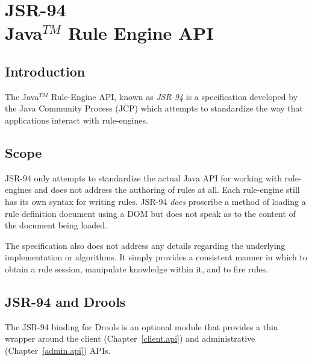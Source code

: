 \chapter[JSR-94 : Java$^{TM}$ Rule-Engine API]{JSR-94\\Java$^{TM}$ Rule Engine API}

\section{Introduction}

The Java$^{TM}$ Rule-Engine API, known as \emph{JSR-94} is a
specification developed by the Java Community Process (JCP)
which attempts to standardize the way that applications interact
with rule-engines.

\section{Scope}

JSR-94 only attempts to standardize the actual Java API for working
with rule-engines and does not address the authoring of rules at all.
Each rule-engine still has its own syntax for writing rules.  JSR-94
\emph{does} proscribe a method of loading a rule definition document
using a DOM  but does not speak as to the
content of the document being loaded.

The specification also does not address any details regarding the
underlying implementation or algorithms.  It simply provides a
consistent manner in which to obtain a rule session, manipulate
knowledge within it, and to fire rules.

\section{JSR-94 and Drools}

The JSR-94 binding for Drools is an optional module that provides a
thin wrapper around the client (Chapter~\vref{client.api}) and
administrative (Chapter~\vref{admin.api}) APIs.

